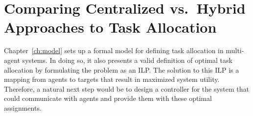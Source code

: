 \documentclass[12pt]{book}
\begin{document}
\chapter{Comparing Centralized vs.~Hybrid Approaches to Task Allocation}\label{ch:cendistexps}

Chapter~\ref{ch:model} sets up a formal model for defining task allocation in multi-agent systems. In doing so, it also presents a valid definition of optimal task allocation by formulating the problem as an ILP. The solution to this ILP is a mapping from agents to targets that result in maximized system utility. Therefore, a natural next step would be to design a controller for the system that could communicate with agents and provide them with these optimal assignments.
\end{document}
